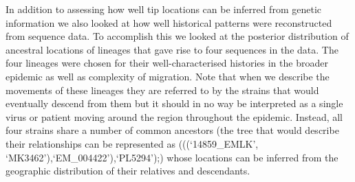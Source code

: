 \documentclass{bmcart}
\begin{document}
In addition to assessing how well tip locations can be inferred from genetic information we also looked at how well historical patterns were reconstructed from sequence data.
To accomplish this we looked at the posterior distribution of ancestral locations of lineages that gave rise to four sequences in the data.
The four lineages were chosen for their well-characterised histories in the broader epidemic as well as complexity of migration.
Note that when we describe the movements of these lineages they are referred to by the strains that would eventually descend from them but it should in no way be interpreted as a single virus or patient moving around the region throughout the epidemic.
Instead, all four strains share a number of common ancestors (the tree that would describe their relationships can be represented as (((`14859\_EMLK', `MK3462'),`EM\_004422'),`PL5294');) whose locations can be inferred from the geographic distribution of their relatives and descendants.
\end{document}
